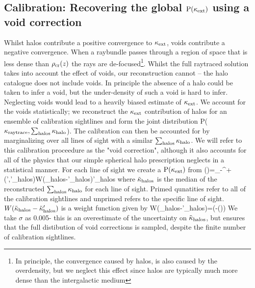 \documentclass[useAMS,usenatbib]{mn2e}
\begin{document}

\subsection{Calibration: Recovering the global ${\rm P}(\kappa_{\rm ext})$ using a void correction}
\label{subsec:voids}

Whilst halos contribute a positive convergence to $\kappa_{\rm ext}$, voids contribute
a negative convergence. When a raybundle passes through a  region of space
that is less dense than $\rho_{\rm cr}(z)$ the rays are de-focused\footnote{In
principle, the convergence caused by halos, is also caused by the overdensity,
but we neglect this effect since halos are typically much more dense than the
intergalactic medium}. Whilst the  full raytraced solution takes into account
the effect of voids, our reconstruction cannot -- the halo catalogue does not
include voids. In principle the absence of a halo could be taken to infer a
void, but the under-density of such a void is hard to infer. Neglecting voids
would lead to a heavily biased estimate of $\kappa_{\rm ext}$. We account for the voids
statistically; we reconstruct
the $\kappa_{\rm ext}$ contribution of halos for an ensemble of calibration sightlines
and form the joint distribution P($\kappa_{\rm raytrace},\sum_{\rm halos} \kappa_{\rm halo}$). The calibration
can then be accounted for by marginalizing over all lines of sight with a similar
 $\sum_{\rm halos} \kappa_{\rm halo}$.  We will refer to this calibration proceedure as the "void correction",
although it also accounts for all of the physics that our simple spherical halo prescription
neglects in a statistical manner. For each line of sight we create a ${\rm P}(\kappa_{\rm ext})$ from
\be
\pr(\kappax)=\int_{-\infty}^{+\infty}\pr(\kapparay',\tilde\kappa'_{\rm halos})W(\tilde\kappa_{\rm halos}-\tilde\kappa'_{\rm halos})\dee \tilde\kappa'_{\rm halos}
\ee
where $\tilde{\kappa}_{\rm halos}$ is the median of the reconstructed $\sum_{\rm halos} \kappa_{\rm halo}$ for each line of sight.
Primed qunatities refer to all of the calibration sightlines and unprimed refers to the specific line of sight.
$W(\tilde\kappa_{\rm halos}-\tilde\kappa'_{\rm halos})$ is a weight function given by
\be
\label{eq:weighting}
W(\tilde\kappa_{\rm halos}-\tilde\kappa'_{\rm halos})=\exp\left(-\left(\right)\right)
\ee
We take $\sigma$ as 0.005- this is an overestimate of the uncertainty on $\tilde\kappa_{\rm halos}$, but ensures that the full distibution of void corrections is sampled, despite the finite number of calibration sightlines.
\end{document}
